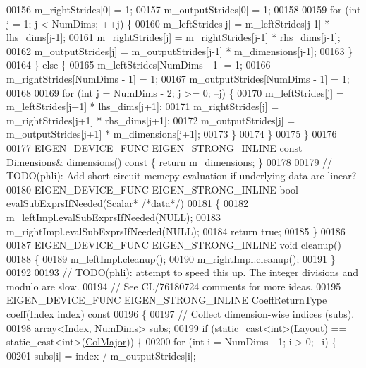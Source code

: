 \begin{DoxyCode}
00156       m\_rightStrides[0] = 1;
00157       m\_outputStrides[0] = 1;
00158 
00159       \textcolor{keywordflow}{for} (\textcolor{keywordtype}{int} j = 1; j < NumDims; ++j) \{
00160         m\_leftStrides[j] = m\_leftStrides[j-1] * lhs\_dims[j-1];
00161         m\_rightStrides[j] = m\_rightStrides[j-1] * rhs\_dims[j-1];
00162         m\_outputStrides[j] = m\_outputStrides[j-1] * m\_dimensions[j-1];
00163       \}
00164     \} \textcolor{keywordflow}{else} \{
00165       m\_leftStrides[NumDims - 1] = 1;
00166       m\_rightStrides[NumDims - 1] = 1;
00167       m\_outputStrides[NumDims - 1] = 1;
00168 
00169       \textcolor{keywordflow}{for} (\textcolor{keywordtype}{int} j = NumDims - 2; j >= 0; --j) \{
00170         m\_leftStrides[j] = m\_leftStrides[j+1] * lhs\_dims[j+1];
00171         m\_rightStrides[j] = m\_rightStrides[j+1] * rhs\_dims[j+1];
00172         m\_outputStrides[j] = m\_outputStrides[j+1] * m\_dimensions[j+1];
00173       \}
00174     \}
00175   \}
00176 
00177   EIGEN\_DEVICE\_FUNC EIGEN\_STRONG\_INLINE \textcolor{keyword}{const} Dimensions& dimensions()\textcolor{keyword}{ const }\{ \textcolor{keywordflow}{return} m\_dimensions; \}
00178 
00179   \textcolor{comment}{// TODO(phli): Add short-circuit memcpy evaluation if underlying data are linear?}
00180   EIGEN\_DEVICE\_FUNC EIGEN\_STRONG\_INLINE \textcolor{keywordtype}{bool} evalSubExprsIfNeeded(Scalar* \textcolor{comment}{/*data*/})
00181   \{
00182     m\_leftImpl.evalSubExprsIfNeeded(NULL);
00183     m\_rightImpl.evalSubExprsIfNeeded(NULL);
00184     \textcolor{keywordflow}{return} \textcolor{keyword}{true};
00185   \}
00186 
00187   EIGEN\_DEVICE\_FUNC EIGEN\_STRONG\_INLINE \textcolor{keywordtype}{void} cleanup()
00188   \{
00189     m\_leftImpl.cleanup();
00190     m\_rightImpl.cleanup();
00191   \}
00192 
00193   \textcolor{comment}{// TODO(phli): attempt to speed this up. The integer divisions and modulo are slow.}
00194   \textcolor{comment}{// See CL/76180724 comments for more ideas.}
00195   EIGEN\_DEVICE\_FUNC EIGEN\_STRONG\_INLINE CoeffReturnType coeff(Index index)\textcolor{keyword}{ const}
00196 \textcolor{keyword}{  }\{
00197     \textcolor{comment}{// Collect dimension-wise indices (subs).}
00198     \hyperlink{class_eigen_1_1array}{array<Index, NumDims>} subs;
00199     \textcolor{keywordflow}{if} (static\_cast<int>(Layout) == static\_cast<int>(\hyperlink{group__enums_ggaacded1a18ae58b0f554751f6cdf9eb13a0cbd4bdd0abcfc0224c5fcb5e4f6669a}{ColMajor})) \{
00200       \textcolor{keywordflow}{for} (\textcolor{keywordtype}{int} i = NumDims - 1; i > 0; --i) \{
00201         subs[i] = index / m\_outputStrides[i];

\end{DoxyCode}
